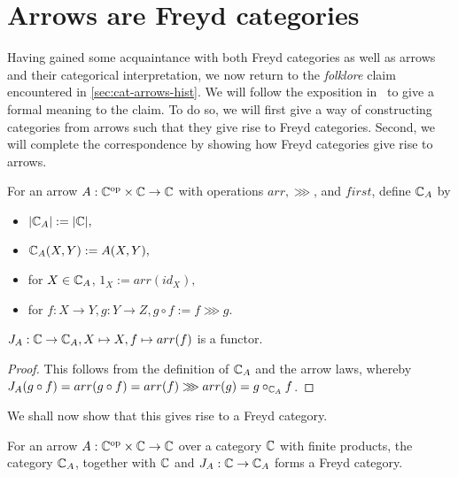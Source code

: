 \section{Arrows are Freyd categories}

Having gained some acquaintance with both Freyd categories as well as arrows and
their categorical interpretation, we now return to the \emph{folklore} claim
encountered in \ref{sec:cat-arrows-hist}. We will follow the exposition
in~\cite{cat-semantics-arr} to give a formal meaning to the claim. To do so, we
will first give a way of constructing categories from arrows such that they give
rise to Freyd categories. Second, we will complete the correspondence by showing
how Freyd categories give rise to arrows.

\begin{definition}
    For an arrow $A : {\mathbb{C}}^{\text{op}} \times \mathbb{C} \to \mathbb{C}$ with operations
    $arr, \ggg$, and $first$, define $\mathbb{C}_A$ by
    \begin{itemize}
        \item $|\mathbb{C}_A| := |\mathbb{C}|,$
        \item $\mathbb{C}_A(X, Y) := A(X, Y),$
        \item for $X \in \mathbb{C}_A$, $1_X := arr(id_X),$
        \item for $f: X \to Y, g: Y \to Z, g \circ f := f \ggg g.$
    \end{itemize}
\end{definition}

\begin{proposition}
    $J_A : \mathbb{C} \to \mathbb{C}_A, X \mapsto X, f \mapsto arr(f)$ is a functor.
\end{proposition}

\begin{proof}
    This follows from the definition of $\mathbb{C}_A$ and the arrow laws, whereby
    $J_A(g \circ f) = arr(g \circ f) = arr(f) \ggg arr(g) = g \circ_{\mathbb{C}_A}
    f$.
\end{proof}

We shall now show that this gives rise to a Freyd category.

\begin{lemma}
    For an arrow $A : {\mathbb{C}}^{\text{op}} \times \mathbb{C} \to \mathbb{C}$ over a category
    $\mathbb{C}$ with finite products, the category $\mathbb{C}_A$, together with $\mathbb{C}$
    and $J_A : \mathbb{C} \to \mathbb{C}_A$ forms a Freyd category.
\end{lemma}

